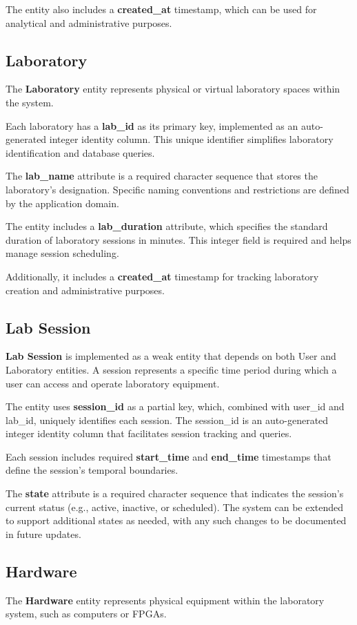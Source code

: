 \documentclass[a4paper,twoside,11pt]{article}
\begin{document}
The entity also includes a \textbf{created\_at} timestamp, which can be used for analytical and administrative purposes.

\subsection{Laboratory}
The \textbf{Laboratory} entity represents physical or virtual laboratory spaces within the system.

Each laboratory has a \textbf{lab\_id} as its primary key, implemented as an auto-generated integer identity column. This unique identifier simplifies laboratory identification and database queries.

The \textbf{lab\_name} attribute is a required character sequence that stores the laboratory's designation. Specific naming conventions and restrictions are defined by the application domain.

The entity includes a \textbf{lab\_duration} attribute, which specifies the standard duration of laboratory sessions in minutes. This integer field is required and helps manage session scheduling.

Additionally, it includes a \textbf{created\_at} timestamp for tracking laboratory creation and administrative purposes.

\subsection{Lab Session}
\textbf{Lab Session} is implemented as a weak entity that depends on both User and Laboratory entities. A session represents a specific time period during which a user can access and operate laboratory equipment.

The entity uses \textbf{session\_id} as a partial key, which, combined with user\_id and lab\_id, uniquely identifies each session. The session\_id is an auto-generated integer identity column that facilitates session tracking and queries.

Each session includes required \textbf{start\_time} and \textbf{end\_time} timestamps that define the session's temporal boundaries.

The \textbf{state} attribute is a required character sequence that indicates the session's current status (e.g., active, inactive, or scheduled). The system can be extended to support additional states as needed, with any such changes to be documented in future updates.

\subsection{Hardware}
The \textbf{Hardware} entity represents physical equipment within the laboratory system, such as computers or FPGAs.
\end{document}
